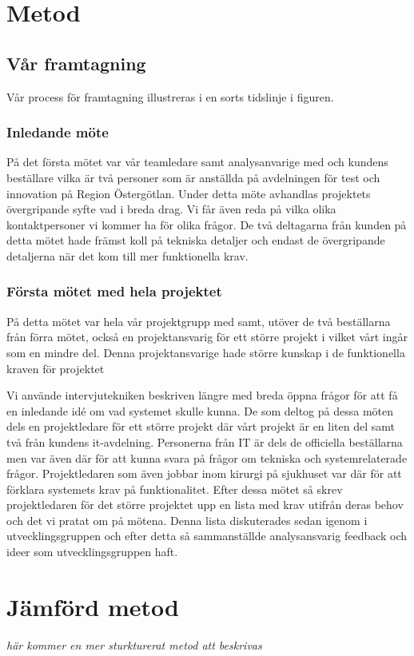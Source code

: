 \section{Metod}
\subsection{Vår framtagning}
Vår process för framtagning illustreras i en sorts tidslinje i figuren.

\subsubsection{Inledande möte}
På det första mötet var vår teamledare samt analysanvarige med och kundens beställare vilka är två personer som är anställda på avdelningen för test och innovation på Region Östergötlan. Under detta möte avhandlas projektets övergripande syfte vad i breda drag.
Vi får även reda på vilka olika kontaktpersoner vi kommer ha för olika frågor. De två deltagarna från kunden på detta mötet hade främst koll på tekniska detaljer och endast de övergripande detaljerna när det kom till mer funktionella krav.

\subsubsection{Första mötet med hela projektet}
På detta mötet var hela vår projektgrupp med samt, utöver de två beställarna från förra mötet, också en projektansvarig för ett större projekt i vilket vårt ingår som en mindre del. Denna projektansvarige hade större kunskap i de funktionella kraven för projektet 

Vi använde intervjutekniken beskriven längre med breda öppna frågor för att få en inledande idé om vad systemet skulle kunna. De som deltog på dessa möten dels en projektledare för ett större projekt där vårt projekt är en liten del samt två från kundens it-avdelning. Personerna från IT är dels de officiella beställarna men var även där för att kunna svara på frågor om tekniska och systemrelaterade frågor. Projektledaren som även jobbar inom kirurgi på sjukhuset var där för att förklara systemets krav på funktionalitet. Efter dessa mötet så skrev projektledaren för det större projektet upp en lista med krav utifrån deras behov och det vi pratat om på mötena. Denna lista diskuterades sedan igenom i utvecklingsgruppen och efter detta så sammanställde analysansvarig feedback och ideer som utvecklingsgruppen haft. 

\section{Jämförd metod}
\emph{här kommer en mer sturkturerat metod att beskrivas}

